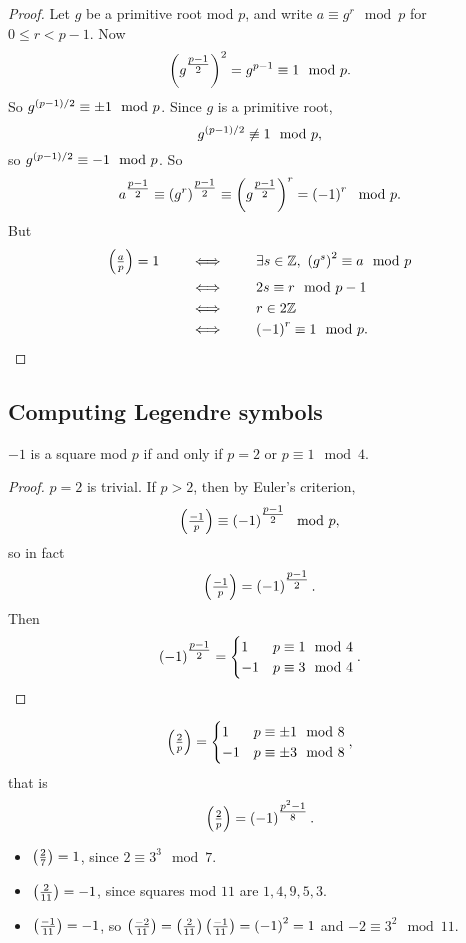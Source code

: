 \begin{proof}
Let $ g $ be a primitive root mod $ p $, and write $ a \equiv g^r \mod p $ for $ 0 \le r < p - 1 $. Now
$$ \left( g^{\tfrac{p - 1}{2}} \right)^2 = g^{p - 1} \equiv 1 \mod p. $$
So $ g^{\left( p - 1 \right) / 2} \equiv \pm 1 \mod p $. Since $ g $ is a primitive root,
$$ g^{\left( p - 1 \right) / 2} \not\equiv 1 \mod p, $$
so $ g^{\left( p - 1 \right) / 2} \equiv -1 \mod p $. So
$$ a^{\tfrac{p - 1}{2}} \equiv \left( g^r \right)^{\tfrac{p - 1}{2}} \equiv \left( g^{\tfrac{p - 1}{2}} \right)^r = \left( -1 \right)^r \mod p. $$
But
\begin{align*}
\left( \tfrac{a}{p} \right) = 1 \qquad
& \iff \qquad \exists s \in \mathbb{Z}, \ \left( g^s \right)^2 \equiv a \mod p \\
& \iff \qquad 2s \equiv r \mod p - 1 \\
& \iff \qquad r \in 2\mathbb{Z} \\
& \iff \qquad \left( -1 \right)^r \equiv 1 \mod p.
\end{align*}
\end{proof}

\subsection{Computing Legendre symbols}

\begin{proposition}
$ -1 $ is a square mod $ p $ if and only if $ p = 2 $ or $ p \equiv 1 \mod 4 $.
\end{proposition}

\begin{proof}
$ p = 2 $ is trivial. If $ p > 2 $, then by Euler's criterion,
$$ \left( \tfrac{-1}{p} \right) \equiv \left( -1 \right)^{\tfrac{p - 1}{2}} \mod p, $$
so in fact
$$ \left( \tfrac{-1}{p} \right) = \left( -1 \right)^{\tfrac{p - 1}{2}}. $$
Then
$$ \left( -1 \right)^{\tfrac{p - 1}{2}} =
\begin{cases}
1 & p \equiv 1 \mod 4 \\
-1 & p \equiv 3 \mod 4
\end{cases}.
$$
\end{proof}

\begin{proposition}
$$ \left( \tfrac{2}{p} \right) =
\begin{cases}
1 & p \equiv \pm 1 \mod 8 \\
-1 & p \equiv \pm 3 \mod 8
\end{cases},
$$
that is
$$ \left( \tfrac{2}{p} \right) = \left( -1 \right)^{\tfrac{p^2 - 1}{8}}. $$
\end{proposition}

\begin{example*}
\hfill
\begin{itemize}
\item $ \left( \tfrac{2}{7} \right) = 1 $, since $ 2 \equiv 3^3 \mod 7 $.
\item $ \left( \tfrac{2}{11} \right) = -1 $, since squares mod $ 11 $ are $ 1, 4, 9, 5, 3 $.
\item $ \left( \tfrac{-1}{11} \right) = -1 $, so $ \left( \tfrac{-2}{11} \right) = \left( \tfrac{2}{11} \right)\left( \tfrac{-1}{11} \right) = \left( -1 \right)^2 = 1 $ and $ -2 \equiv 3^2 \mod 11 $.
\end{itemize}
\end{example*}


